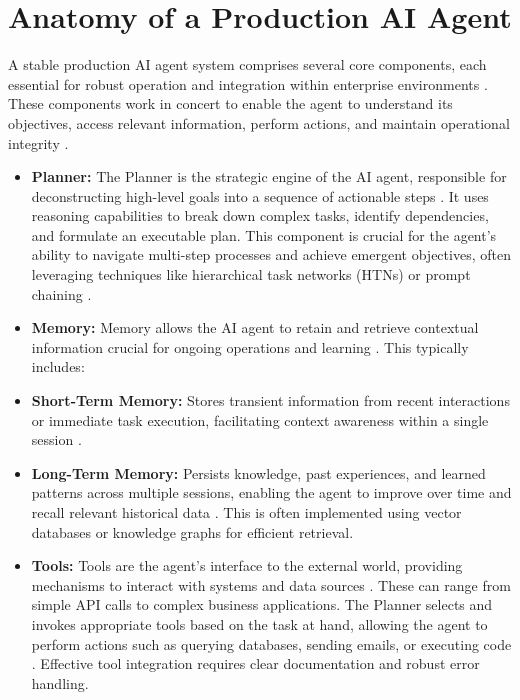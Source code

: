 \section{Anatomy of a Production AI Agent}

A stable production AI agent system comprises several core components, each essential for robust operation and integration within enterprise environments \cite{Reger2026}. These components work in concert to enable the agent to understand its objectives, access relevant information, perform actions, and maintain operational integrity \cite{Gartner2025}.

\begin{itemize}
  \item \textbf{Planner:} The Planner is the strategic engine of the AI agent, responsible for deconstructing high-level goals into a sequence of actionable steps \cite{Reger2026}. It uses reasoning capabilities to break down complex tasks, identify dependencies, and formulate an executable plan. This component is crucial for the agent's ability to navigate multi-step processes and achieve emergent objectives, often leveraging techniques like hierarchical task networks (HTNs) or prompt chaining \cite{Gartner2025}.
\end{itemize}

\begin{itemize}
  \item \textbf{Memory:} Memory allows the AI agent to retain and retrieve contextual information crucial for ongoing operations and learning \cite{Reger2026}. This typically includes:
  \item \textbf{Short-Term Memory:} Stores transient information from recent interactions or immediate task execution, facilitating context awareness within a single session \cite{Gartner2025}.
  \item \textbf{Long-Term Memory:} Persists knowledge, past experiences, and learned patterns across multiple sessions, enabling the agent to improve over time and recall relevant historical data \cite{Reger2026}. This is often implemented using vector databases or knowledge graphs for efficient retrieval.
\end{itemize}

\begin{itemize}
  \item \textbf{Tools:} Tools are the agent's interface to the external world, providing mechanisms to interact with systems and data sources \cite{Gartner2025}. These can range from simple API calls to complex business applications. The Planner selects and invokes appropriate tools based on the task at hand, allowing the agent to perform actions such as querying databases, sending emails, or executing code \cite{Reger2026}. Effective tool integration requires clear documentation and robust error handling.
\end{itemize}

